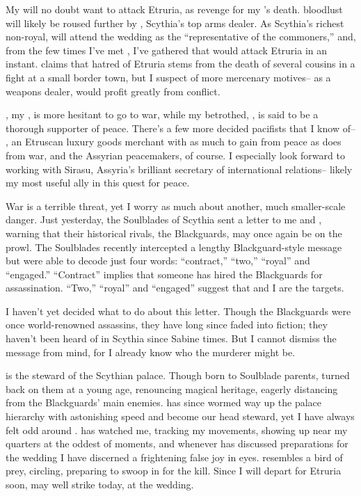\documentclass[char]{Kos}
\begin{document}
My \cScythiaQueen{\parent} will no doubt want to attack Etruria, as revenge for my \cFugitive{\sibling}'s death. \cScythiaQueen{\Their} bloodlust will likely be roused further by \cArmsDealer{}, Scythia's top arms dealer. As Scythia's richest non-royal, \cArmsDealer{} will attend the wedding as the ``representative of the commoners,'' and, from the few times I've met \cArmsDealer{\them}, I've gathered that \cArmsDealer{\they} would attack Etruria in an instant. \cArmsDealer{\They} claims that \cArmsDealer{\their} hatred of Etruria stems from the death of several cousins in a fight at a small border town, but I suspect \cArmsDealer{\them} of more mercenary motives-- as a weapons dealer, \cArmsDealer{} would profit greatly from conflict. 

\cScythiaKing{}, my \cScythiaKing{\parent}, is more hesitant to go to war, while my betrothed, \cGroom{\them}, is said to be a thorough supporter of peace. There's a few more decided pacifists that I know of-- \cMerchant{}, an Etruscan luxury goods merchant with as much to gain from peace as \cArmsDealer{} does from war, and the Assyrian peacemakers, of course. I especially look forward to working with Sirasu, Assyria's brilliant secretary of international relations-- likely my most useful ally in this quest for peace.

War is a terrible threat, yet I worry as much about another, much smaller-scale danger. Just yesterday, the Soulblades of Scythia sent a letter to me and \cGroom{}, warning that their historical rivals, the Blackguards, may once again be on the prowl. The Soulblades recently intercepted a lengthy Blackguard-style message but were able to decode just four words: ``contract,'' ``two,'' ``royal'' and ``engaged.'' ``Contract'' implies that someone has hired the Blackguards for assassination. ``Two,'' ``royal'' and ``engaged'' suggest that \cGroom{} and I are the targets.

I haven't yet decided what to do about this letter. Though the Blackguards were once world-renowned assassins, they have long since faded into fiction; they haven't been heard of in Scythia since Sabine times. But I cannot dismiss the message from mind, for I already know who the murderer might be.

\cButler{} is the steward of the Scythian palace. Though born to Soulblade parents, \cButler{\they} turned \cButler{\their} back on them at a young age, renouncing \cButler{\their} magical heritage, eagerly distancing \cButler{\themself} from the Blackguards' main enemies. \cButler{\They} has since wormed \cButler{\their} way up the palace hierarchy with astonishing speed and become our head steward, yet I have always felt odd around \cButler{\them}. \cButler{} has watched me, tracking my movements, showing up near my quarters at the oddest of moments, and whenever \cButler{\they} has discussed preparations for the wedding I have discerned a frightening false joy in \cButler{\their} eyes. \cButler{\They} resembles a bird of prey, circling, preparing to swoop in for the kill. Since I will depart for Etruria soon, \cButler{\they} may well strike today, at the wedding.
\end{document}
